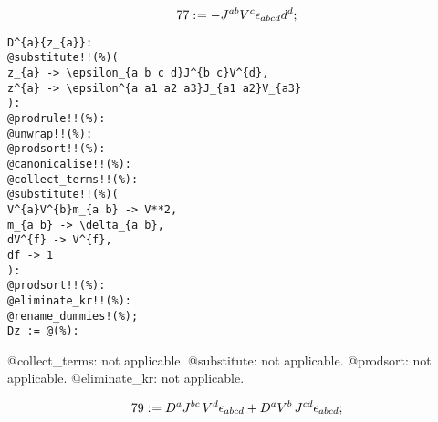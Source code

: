 \documentclass[11pt]{article}
\def\specialcolon{\mathrel{\mathop{:}}\hspace{-.5em}}
\begin{document}
\begin{dmath*}[compact, spread=2pt]
77\specialcolon{}= -{J}^{a b} {V}^{c} {\epsilon}_{a b c d} {d}^{d};
\end{dmath*}
{\color[named]{Blue}\begin{verbatim}
D^{a}{z_{a}}:
@substitute!!(%)(
z_{a} -> \epsilon_{a b c d}J^{b c}V^{d},
z^{a} -> \epsilon^{a a1 a2 a3}J_{a1 a2}V_{a3}
):
@prodrule!!(%):
@unwrap!!(%):
@prodsort!!(%):
@canonicalise!!(%):
@collect_terms!!(%):
@substitute!!(%)(
V^{a}V^{b}m_{a b} -> V**2,
m_{a b} -> \delta_{a b},
dV^{f} -> V^{f},
df -> 1
):
@prodsort!!(%):
@eliminate_kr!!(%):
@rename_dummies!(%);
Dz := @(%):
\end{verbatim}}
@collect\_terms: not applicable.
@substitute: not applicable.
@prodsort: not applicable.
@eliminate\_kr: not applicable.








\begin{dmath*}[compact, spread=2pt]
79\specialcolon{}= {D}^{a}{{J}^{b c}}\,  {V}^{d} {\epsilon}_{a b c d} + {D}^{a}{{V}^{b}}\,  {J}^{c d} {\epsilon}_{a b c d};
\end{dmath*}
\end{document}

